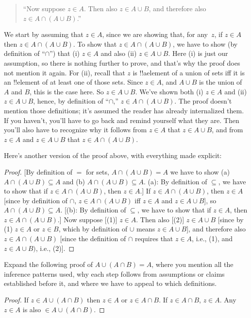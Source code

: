 \documentclass[../../../include/open-logic-section]{subfiles}
\begin{document}
\begin{quote}
``Now suppose $z \in A$. Then also $z \in A \cup B$, and
therefore also $z \in A \cap (A \cup B)$.''
\end{quote}

We start by assuming that $z \in A$, since we are showing that, for
any~$z$, if $z \in A$ then $z \in A \cap (A \cup B)$.  To show that $z
\in A \cap (A \cup B)$, we have to show (by definition of ``$\cap$'')
that (i) $z \in A$ and also (ii) $z \in A \cup B$. Here (i) is just
our assumption, so there is nothing further to prove, and that's why
the proof does not mention it again. For (ii), recall that $z$ is
!!a{element} of a union of sets iff it is an !!{element} of at least
one of those sets. Since $z \in A$, and $A \cup B$ is the union of $A$
and $B$, this is the case here. So $z \in A \cup B$. We've shown both
(i) $z \in A$ and (ii) $z \in A \cup B$, hence, by definition of
``$\cap$,'' $z \in A \cap (A \cup B)$.  The proof doesn't mention
those definitions; it's assumed the reader has already internalized
them.  If you haven't, you'll have to go back and remind yourself what
they are. Then you'll also have to recognize why it follows from $z
\in A$ that $z \in A \cup B$, and from $z \in A$ and $z \in A \cup B$
that $z \in A \cap (A \cup B)$.

Here's another version of the proof above, with everything made
explicit:
\begin{proof}{}
[By definition of $=$ for sets, $A \cap (A \cup B) = A$ we have to
  show (a) $A \cap (A \cup B) \subseteq A$ and (b) $A \cap (A \cup B)
  \subseteq A$. (a): By definition of $\subseteq$, we have to show
  that if $z \in A \cap (A \cup B)$, then $z \in A$.]  If $z \in A
\cap (A \cup B)$, then $z \in A$ [since by definition of $\cap$, $z
  \in A \cap (A \cup B)$ iff $z \in A$ and $z \in A \cup B$], so $A
\cap (A \cup B) \subseteq A$. [(b): By definition of $\subseteq$, we
  have to show that if $z \in A$, then $z \in A \cap (A \cup B)$.] Now
suppose [(1)] $z \in A$. Then also [(2)] $z \in A \cup B$ [since by
  (1) $z \in A$ or $z \in B$, which by definition of $\cup$ means $z
  \in A \cup B$], and therefore also $z \in A \cap (A \cup B)$ [since
  the definition of $\cap$ requires that $z \in A$, i.e., (1), and $z
  \in A \cup B)$, i.e., (2)].
\end{proof}

\begin{prob}
Expand the following proof of $A \cup (A \cap B) = A$, where you
mention all the inference patterns used, why each step follows from
assumptions or claims established before it, and where we have to
appeal to which definitions.
\begin{proof}
  If $z \in A \cup (A \cap B)$ then $z \in A$ or $z \in A \cap B$. If
  $z \in A \cap B$, $z \in A$. Any $z \in A$ is also $\in A \cup (A
  \cap B)$.
\end{proof}
\end{prob}
\end{document}
